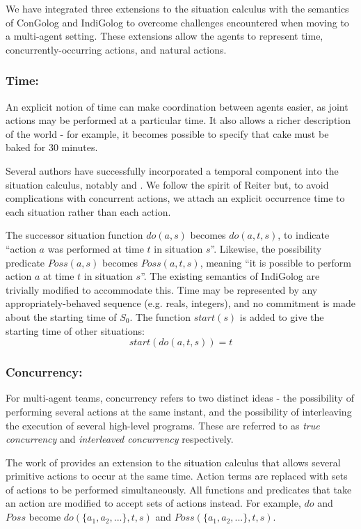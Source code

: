 \documentclass{llncs}
\begin{document}
We have integrated three extensions to the situation calculus with the
semantics of ConGolog and IndiGolog to overcome
challenges encountered when moving to a multi-agent setting.  These
extensions allow the agents to represent time, concurrently-occurring actions,
and natural actions.

\subsubsection{Time:}
An explicit notion of time can make coordination between agents
easier, as joint actions may be performed at a particular time.  It
also allows a richer description of the world - for example, it becomes possible
to specify that cake must be baked for 30 minutes.

Several authors have successfully incorporated a temporal component
into the situation calculus, notably \cite{pinto94temporal} and
\cite{reiter96sc_nat_conc}.  We follow the spirit of Reiter but, to
avoid complications with concurrent actions, we attach an explicit 
occurrence time to each situation rather than each action.

The successor situation function $do(a,s)$
becomes $do(a,t,s)$, to indicate ``action $a$ was performed at
time $t$ in situation $s$''. Likewise, the possibility predicate
$Poss(a,s)$ becomes $Poss(a,t,s)$, meaning ``it is possible to
perform action $a$ at time $t$ in situation $s$''.  The existing semantics
of IndiGolog are trivially modified to accommodate this.
Time may be represented by any appropriately-behaved sequence (e.g. reals,
integers), and no commitment is made about the starting time of $S_0$.
The function $start(s)$ is added to give the starting time of other situations:
\begin{equation}
\label{eqn:sit_start}
start(do(a,t,s))=t
\end{equation}

\subsubsection{Concurrency:} 
For multi-agent teams, concurrency refers to two distinct ideas -
the possibility of performing several actions at the same instant,
and the possibility of interleaving the execution of several high-level
programs. These are referred to as \emph{true concurrency} and \emph{interleaved
concurrency} respectively.

The work of \cite{lin92sc_conc,reiter96sc_nat_conc} provides an extension
to the situation calculus that allows several primitive actions to
occur at the same time. Action terms are replaced with sets of actions
to be performed simultaneously. All functions and predicates that
take an action are modified to accept sets of actions instead. For
example, $do$ and $Poss$ become $do(\{ a_{1},a_{2},...\},t,s)$
and $Poss(\{ a_{1},a_{2},...\},t,s)$.
\end{document}
